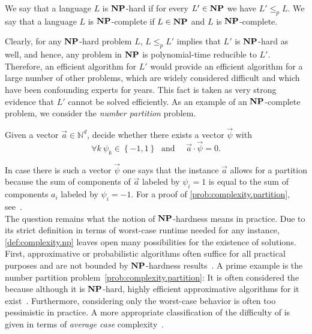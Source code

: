 \begin{definition}
  \label{def:complexity.hard_and_complete}
  We say that a language $L$ is $\mathbf{NP}$-hard if for every $L' \in \mathbf{NP}$ we have $L' \le_p L$.
  We say that a language $L$ is $\mathbf{NP}$-complete if $L \in \mathbf{NP}$ and $L$ is $\mathbf{NP}$-complete.
\end{definition}

Clearly, for any $\mathbf{NP}$-hard problem $L$, $L \le_p L'$ implies that $L'$ is $\mathbf{NP}$-hard as well, and hence, any problem in $\mathbf{NP}$ is polynomial-time reducible to $L'$.
Therefore, an efficient algorithm for $L'$ would provide an efficient algorithm for a large number of other problems, which are widely considered difficult and which have been confounding experts for years.
This fact is taken as very strong evidence that $L'$ cannot be solved efficiently.
As an example of an $\mathbf{NP}$-complete problem, we consider the \emph{number partition} problem.
\begin{problem}\label{prob:complexity.partition}
  Given a vector $\vec a \in \mathbb{N}^d$, decide whether there exists a vector $\vec \psi$ with
  \[
    \forall{k}\:\psi_{k}\in\left\{ -1,1\right\} \;\textrm{ and }\quad \vec a \cdot \vec\psi=0.
    \label{eq:ellpos.partition_vector}
  \]
\end{problem}
In case there is such a vector $\vec \psi$ one says that the instance $\vec a$ allows for a partition because the sum of components of $\vec a$ labeled by $\psi_i = 1$ is equal to the sum of components $a_i$ labeled by $\psi_i = -1$.
For a proof of \cref{prob:complexity.partition}, see~\cite{Garey_2002_Computers}.\\


The question remains what the notion of $\mathbf{NP}$-hardness means in practice.
Due to its strict definition in terms of worst-case runtime needed for any instance, \cref{def:complexity.np} leaves open many possibilities for the existence of  solutions.
First, approximative or probabilistic algorithms often suffice for all practical purposes and are not bounded by $\mathbf{NP}$-hardness results~\cite{Garey_2002_Computers,Arora_2009_Computational}.
A prime example is the number partition problem~\ref{prob:complexity.partition}:
It is often considered the  because although it is $\mathbf{NP}$-hard, highly efficient approximative algorithms for it exist~\cite{Kellerer_1997_Efficient}.
Furthermore, considering only the worst-case behavior is often too pessimistic in practice.
A more appropriate classification of the difficulty of  is given in terms of \emph{average case} complexity~\cite{Arora_2009_Computational}.

